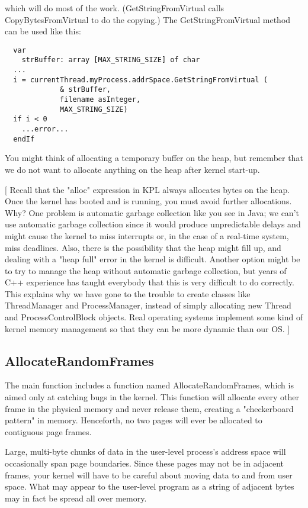 \documentclass[12pt]{article}
\begin{document}
which will do most of the work.  (GetStringFromVirtual calls
CopyBytesFromVirtual to do the copying.)  The GetStringFromVirtual
method can be used like this:

\begin{verbatim}
  var
    strBuffer: array [MAX_STRING_SIZE] of char
  ...
  i = currentThread.myProcess.addrSpace.GetStringFromVirtual (
             & strBuffer,
             filename asInteger,
             MAX_STRING_SIZE)
  if i < 0
    ...error...
  endIf
\end{verbatim}

You might think of allocating a temporary buffer on the heap, but
remember that we do not want to allocate anything on the heap after
kernel start-up.

[ Recall that the "alloc" expression in KPL always allocates bytes on
the heap.  Once the kernel has booted and is running, you must avoid
further allocations.  Why?  One problem is automatic garbage
collection like you see in Java; we can't use automatic garbage
collection since it would produce unpredictable delays and might cause
the kernel to miss interrupts or, in the case of a real-time system,
miss deadlines.  Also, there is the possibility that the heap might
fill up, and dealing with a "heap full" error in the kernel is
difficult.  Another option might be to try to manage the heap without
automatic garbage collection, but years of C++ experience has taught
everybody that this is very difficult to do correctly.  This explains
why we have gone to the trouble to create classes like ThreadManager
and ProcessManager, instead of simply allocating new Thread and
ProcessControlBlock objects.  Real operating systems implement some
kind of kernel memory management so that they can be more dynamic
than our OS. ]

\subsection{AllocateRandomFrames}

The main function includes a function named AllocateRandomFrames,
which is aimed only at catching bugs in the kernel.  This function
will allocate every other frame in the physical memory and never
release them, creating a "checkerboard pattern" in memory.
Henceforth, no two pages will ever be allocated to contiguous page
frames.

Large, multi-byte chunks of data in the user-level process's address
space will occasionally span page boundaries.  Since these pages may
not be in adjacent frames, your kernel will have to be careful about
moving data to and from user space.  What may appear to the user-level
program as a string of adjacent bytes may in fact be spread all over
memory.
\end{document}
